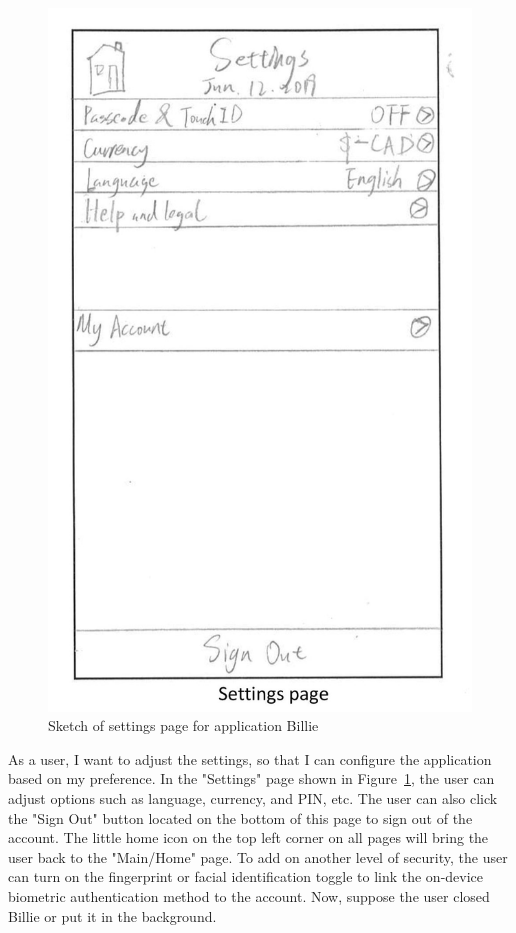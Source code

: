 \documentclass{sigchi}
\begin{document}
\begin{figure}[h!]
\centering
  \includegraphics[width=0.5\columnwidth]{5-settings-page.jpg}
  \caption{Sketch of settings page for application Billie}
  \label{fig:figure20}
\end{figure}
As a user, I want to adjust the settings, so that I can configure the application based on my preference. In the "Settings" page shown in Figure~\ref{fig:figure20}, the user can adjust options such as language, currency, and PIN, etc. The user can also click the "Sign Out" button located on the bottom of this page to sign out of the account. The little home icon on the top left corner on all pages will bring the user back to the "Main/Home" page. To add on another level of security, the user can turn on the fingerprint or facial identification toggle to link the on-device biometric authentication method to the account. Now, suppose the user closed Billie or put it in the background.
\end{document}

